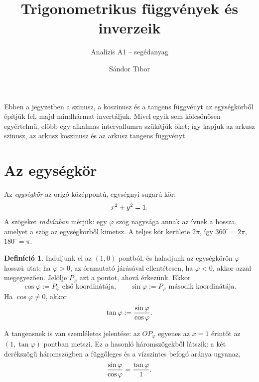 \documentclass[11pt]{scrartcl}
\title{Trigonometrikus függvények és inverzeik}
\subtitle{Analízis A1 -- segédanyag}
\author{Sándor Tibor}
\date{}
\theoremstyle{definition}
\newtheorem{definition}{Definíció}
\theoremstyle{remark}
\begin{document}
\maketitle

Ebben a jegyzetben a szinusz, a koszinusz és a tangens függvényt az
egységkörből építjük fel, majd mindhármat invertáljuk. Mivel egyik sem
kölcsönösen egyértelmű, előbb egy alkalmas intervallumra szűkítjük őket; így
kapjuk az arkusz szinusz, az arkusz koszinusz és az arkusz tangens függvényt.

\section{Az egységkör}

Az \emph{egységkör} az origó középpontú, egységnyi sugarú kör:
\[
	x^2 + y^2 = 1\text.
\]
A szögeket \emph{radiánban} mérjük: egy $\varphi$ szög nagysága annak az
ívnek a hossza, amelyet a szög az egységkörből kimetsz. A teljes kör kerülete
$2\pi$, így $360^\circ = 2\pi$, $180^\circ = \pi$.

\begin{definition}
	Induljunk el az $(1, 0)$ pontból, és haladjunk az egységkörön $\varphi$
	hosszú utat; ha $\varphi > 0$, az óramutató járásával ellentétesen, ha
	$\varphi < 0$, akkor azzal megegyezően. Jelölje $P_\varphi$ azt a pontot,
	ahová érkezünk. Ekkor
	\[
		\cos\varphi := P_\varphi \text{ első koordinátája,} \qquad
		\sin\varphi := P_\varphi \text{ második koordinátája.}
	\]
	Ha $\cos\varphi \ne 0$, akkor
	\[
		\tan\varphi := \frac{\sin\varphi}{\cos\varphi}\text.
	\]
\end{definition}

A tangensnek is van szemléletes jelentése: az $OP_\varphi$ egyenes az
$x = 1$ érintőt az $(1, \tan\varphi)$ pontban metszi. Ez a hasonló
háromszögekből látszik: a két derékszögű háromszögben a függőleges és a
vízszintes befogó aránya ugyanaz,
\[
	\frac{\sin\varphi}{\cos\varphi} = \frac{\tan\varphi}{1}
	\text.
\]
\end{document}
